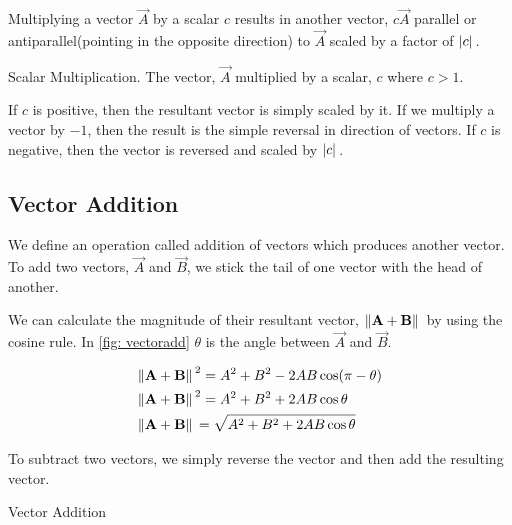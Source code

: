Multiplying a vector \(\vec{A}\) by a scalar \(c\) results
in another vector, \(c\vec{A}\) parallel or antiparallel(pointing in the opposite 
direction) to \(\vec{A}\) scaled by a factor of \(\abs*{c}\).

\newpage

\begin{marginfigure}
    \hspace{-5em}
    \vspace{-2em}
    \centering
    \caption{Scalar Multiplication. The vector, \(\vec{A}\) multiplied 
    by a scalar, \(c\) where \(c > 1\).}
\end{marginfigure}


If \(c\) is positive, then the resultant vector is simply scaled by it.
If we multiply a vector by \(-1\), then the result is the simple
reversal in direction of vectors. If \(c\) is negative, then the 
vector is reversed and scaled by \(\abs*{c}\). 

\subsection{Vector Addition}

We define an operation called addition of vectors which produces another vector.
To add two vectors, \(\vec{A}\) and \(\vec{B}\), we stick the tail
of one vector with the head of another. 

We can calculate the magnitude of their resultant vector, \(\norm*{\boldsymbol{\mathbf{A}} + \boldsymbol{\mathbf{B}}}\)
by using the cosine rule. In \cref{fig: vectoradd} \(\theta\) is the angle between 
\(\vec{A}\) and \(\vec{B}\).

\begin{align*}
    &\norm*{\boldsymbol{\mathbf{A}} + \boldsymbol{\mathbf{B}}}^2 = A^2 + B^2 - 2AB\cos(\pi - \theta) \\
    &\norm*{\boldsymbol{\mathbf{A}} + \boldsymbol{\mathbf{B}}}^2 = A^2 + B^2 + 2AB\cos\theta \\
    &\norm*{\boldsymbol{\mathbf{A}} + \boldsymbol{\mathbf{B}}} = \sqrt{A^2 + B^2 + 2AB\cos\theta}
\end{align*}

To subtract two vectors, we simply reverse the vector and then add the resulting vector.

\begin{marginfigure}
    \caption{Vector Addition}
    \label{fig: vectoradd}
\end{marginfigure}

